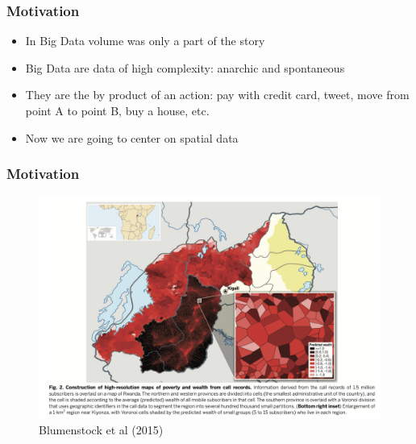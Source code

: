 \documentclass[
  shownotes,
  xcolor={svgnames},
  hyperref={colorlinks,citecolor=DarkBlue,linkcolor=DarkRed,urlcolor=DarkBlue}
  ]{beamer}
\begin{document}
\begin{frame}[fragile]
\frametitle{Motivation}


\begin{itemize}
  \item In Big Data  volume was only a part of the story 
  \bigskip
  \item Big Data are data of high complexity: anarchic and spontaneous
  \bigskip
  \item They are the by product of an action: pay with credit card, tweet, move from point A to point B, buy a house, etc.
	\bigskip
  \item Now we are going to center on spatial data
\end{itemize}

\end{frame}


\begin{frame}[fragile]
\frametitle{Motivation}

\begin{figure}[H] \centering
  \centering
  \includegraphics[scale=0.3]{figures/blumenstock_fig2.png}
  \\
  \tiny Blumenstock et al (2015)
\end{figure}

\end{frame}
\end{document}
